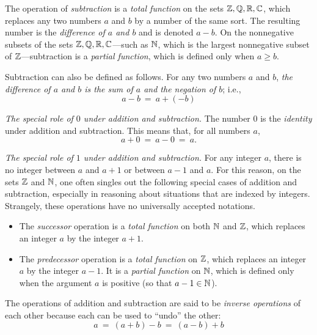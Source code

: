 \noindent
The operation of {\it subtraction} is a
{\em total function} on the sets $\mathbb{Z}, \mathbb{Q}, \mathbb{R}, \mathbb{C}$, which replaces any
two numbers $a$ and $b$ by a number of the same sort.  The resulting
number is the {\em difference of $a$ and $b$}
 and is denoted $a-b$.  On
the nonnegative subsets of the sets $\mathbb{Z}, \mathbb{Q}, \mathbb{R}, \mathbb{C}$---such as $\mathbb{N}$,
which is the largest nonnegative subset of $\mathbb{Z}$---subtraction is a
{\em partial function}, which is defined only when $a \geq b$.

Subtraction can also be defined as follows.  For any two numbers $a$
and $b$, {\em the difference of $a$ and $b$ is the sum of $a$ and the
  negation of $b$}; i.e.,
\[ a-b \ = \ a + (-b) \]

{\em The special role of $0$ under addition and subtraction.}
%
The number $0$ is the {\it identity} under addition and
  subtraction.
%
This means that, for all numbers $a$,
\[ a+0 \ = \ a-0 \ = \ a. \]

{\em The special role of $1$ under addition and subtraction.}
%
For any integer $a$, there is no integer between $a$ and $a+1$ or
between $a-1$ and $a$.  For this reason, on the sets $\mathbb{Z}$ and $\mathbb{N}$,
one often singles out the following special cases of addition and
subtraction, especially in reasoning about situations that are indexed
by integers.  Strangely, these operations have no universally accepted
notations.
\begin{itemize}
\item
The {\it successor} operation is
a {\em total function} on both $\mathbb{N}$ and $\mathbb{Z}$, which replaces an
integer $a$ by the integer $a+1$.
\item
The {\it predecessor} operation
is a {\em total function} on $\mathbb{Z}$, which replaces an integer $a$ by
the integer $a-1$.  It is a {\em partial function} on $\mathbb{N}$, which is
defined only when the argument $a$ is positive (so that $a-1 \in \mathbb{N}$).
\end{itemize}

The operations of addition and subtraction are said to be {\em
  inverse operations}
 of each other because each can be used to ``undo'' the
other:
\[
a \ = \ (a+b) -b \ = \ (a-b) +b
\]

\medskip

